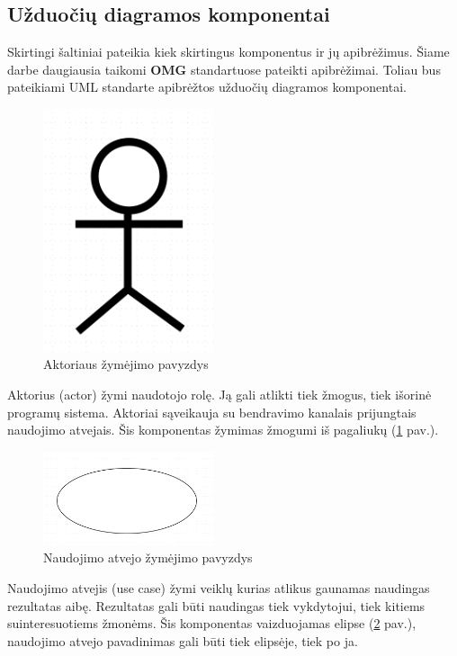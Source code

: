 \documentclass{VUMIFInfBakalaurinis}
\begin{document}
\subsection{Užduočių diagramos komponentai} \label{section:use_cases_components}
Skirtingi šaltiniai pateikia kiek skirtingus komponentus ir jų apibrėžimus. Šiame darbe daugiausia taikomi \textbf{OMG} standartuose pateikti apibrėžimai. Toliau bus pateikiami UML standarte apibrėžtos užduočių diagramos komponentai.

\begin{figure}[H]
	\centering
	\includegraphics[width=5cm]{img/use_case_components/actor}
	\caption{Aktoriaus žymėjimo pavyzdys}
	\label{img:use_case_components_actor}
\end{figure}

Aktorius (actor) žymi naudotojo rolę. Ją gali atlikti tiek žmogus, tiek išorinė programų sistema. Aktoriai sąveikauja su bendravimo kanalais prijungtais naudojimo atvejais. Šis komponentas žymimas žmogumi iš pagaliukų (\ref{img:use_case_components_actor} pav.).

\begin{figure}[H]
	\centering
	\includegraphics[width=5cm]{img/use_case_components/use_case}
	\caption{Naudojimo atvejo žymėjimo pavyzdys}
	\label{img:use_case_components_use_case}
\end{figure}

Naudojimo atvejis (use case) žymi veiklų kurias atlikus gaunamas naudingas rezultatas aibę. Rezultatas gali būti naudingas tiek vykdytojui, tiek kitiems suinteresuotiems žmonėms. Šis komponentas vaizduojamas elipse (\ref{img:use_case_components_use_case} pav.),
naudojimo atvejo pavadinimas gali būti tiek elipsėje, tiek po ja.
\end{document}
